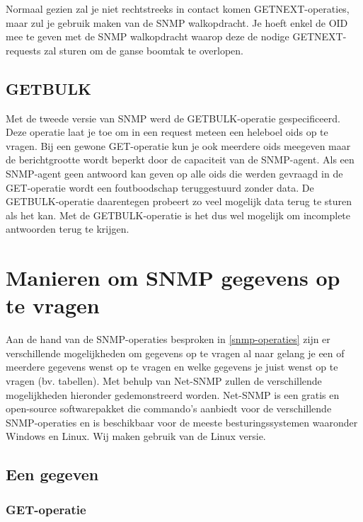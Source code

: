 Normaal gezien zal je niet rechtstreeks in contact komen GETNEXT-operaties, maar zul je gebruik maken van de SNMP walkopdracht.
Je hoeft enkel de OID mee te geven met de SNMP walkopdracht waarop deze de nodige GETNEXT-requests zal sturen om de ganse boomtak te overlopen.



\subsection{GETBULK}
Met de tweede versie van SNMP werd de GETBULK-operatie gespecificeerd.
Deze operatie laat je toe om in een request meteen een heleboel \glspl{oid} op te vragen.
Bij een gewone GET-operatie kun je ook meerdere \glspl{oid} meegeven maar de berichtgrootte wordt beperkt door de capaciteit van de SNMP-agent.
Als een SNMP-agent geen antwoord kan geven op alle \glspl{oid} die werden gevraagd in de GET-operatie wordt een foutboodschap teruggestuurd zonder data.
De GETBULK-operatie daarentegen probeert zo veel mogelijk data terug te sturen als het kan.
Met de GETBULK-operatie is het dus wel mogelijk om incomplete antwoorden terug te krijgen.\cite{essentialsnmp}

\section{Manieren om SNMP gegevens op te vragen}
\label{manieren-om-snmp-gegevens-op-te-vragen}

Aan de hand van de SNMP-operaties besproken in \cref{snmp-operaties} zijn er verschillende mogelijkheden om gegevens op te vragen
al naar gelang je een of meerdere gegevens wenst op te vragen en welke gegevens  je juist wenst op te vragen (bv. tabellen).
Met behulp van Net-SNMP zullen de verschillende mogelijkheden hieronder gedemonstreerd worden.
Net-SNMP is een gratis en open-source softwarepakket die commando's aanbiedt voor de verschillende SNMP-operaties en
is beschikbaar voor de meeste besturingssystemen waaronder Windows en Linux.
Wij maken gebruik van de Linux versie.


\subsection{Een gegeven}

\subsubsection{GET-operatie}

